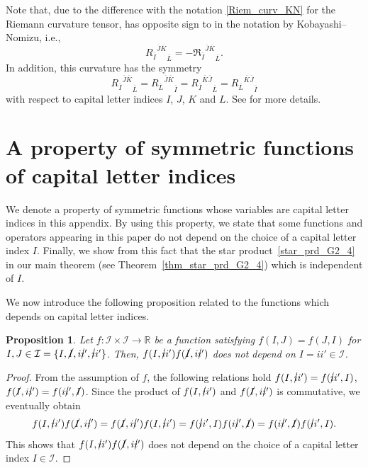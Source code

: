 \documentclass[pdftex]{sigma}
\numberwithin{equation}{section}
\newtheorem{Proposition}[Theorem]{Proposition}
 { \theoremstyle{definition}
\newtheorem{Definition}[Theorem]{Definition}
\newtheorem{Note}[Theorem]{Note}
\newtheorem{Example}[Theorem]{Example}
\newtheorem{Remark}[Theorem]{Remark} }
\begin{document}
Note that, due to the difference with the notation \eqref{Riem_curv_KN} for the Riemann curvature tensor,  has opposite sign to  in the notation by Kobayashi--Nomizu, i.e.,
\[
{{R_{\overline{I}}}^{\overline{J} \overline{K}}}_{\overline{L}}
= -{{\mathfrak{R}_{\overline{I}}}^{\overline{J} \overline{K}}}_{\overline{L}}.
\] In addition, this curvature has the symmetry
\[
 {{R_{\overline{I}}}^{\overline{J} \overline{K}}}_{\overline{L}}
 =
 {{R_{\overline{L}}}^{\overline{J} \overline{K}}}_{\overline{I}}
 =
 {{R_{\overline{I}}}^{\overline{K} \overline{J}}}_{\overline{L}}
 =
 {{R_{\overline{L}}}^{\overline{K} \overline{J}}}_{\overline{I}}
\] with respect to capital letter indices $I$, $J$, $K$ and $L$. See \cite{HS1,OS_jrnl} for more details.

\section{A property of symmetric functions of capital letter indices}
\label{appendix_symmetry_function}

We denote a property of symmetric functions whose variables are capital letter indices in this appendix. By using this property, we state that some functions and operators appearing in this paper do not depend on the choice of a capital letter index $I$. Finally, we show from this fact that the star product~\eqref{star_prd_G2_4} in our main theorem (see Theorem~\ref{thm_star_prd_G2_4}) which is independent of $I$.

We now introduce the following proposition related to the functions which depends on capital letter indices.
\begin{Proposition}\label{prop_app_sym_fct}
Let
$
f\colon
\mathcal{I}
\times
\mathcal{I}
\to
\mathbb{R}
$
be a function satisfying
$
f(I,J)
=
f(J,I)
$
for
$
I,J
\in
\mathcal{I}
=
\{
I,
\cancel{I},
i\cancel{i}',
\cancel{i}i'
\}
$.
Then,
$
f(I,\cancel{i}i')
f(\cancel{I},i\cancel{i}')
$
does not depend on
$
I
=
ii'
\in
\mathcal{I}
$.
\end{Proposition}

\begin{proof}
From the assumption of $f$, the following relations hold
$
f(I,\cancel{i}i')
=
f(\cancel{i}i',I)$,
$
f(\cancel{I},i\cancel{i}')
=
f(i\cancel{i}',\cancel{I})$.
Since the product of
$
f(I,\cancel{i}i')
$
and
$
f(\cancel{I},i\cancel{i}')
$
is commutative, we eventually obtain
\begin{align*}
f(I,\cancel{i}i')
f(\cancel{I},i\cancel{i}')
=
f(\cancel{I},i\cancel{i}')
f(I,\cancel{i}i')
=
f(\cancel{i}i',I)
f(i\cancel{i}',\cancel{I})
=
f(i\cancel{i}',\cancel{I})
f(\cancel{i}i',I).
\end{align*}
This shows that
$
f(I,\cancel{i}i')
f(\cancel{I},i\cancel{i}')
$
does not depend on the choice of a capital letter index $I\in\mathcal{I}$.%
\end{proof}
\end{document}
